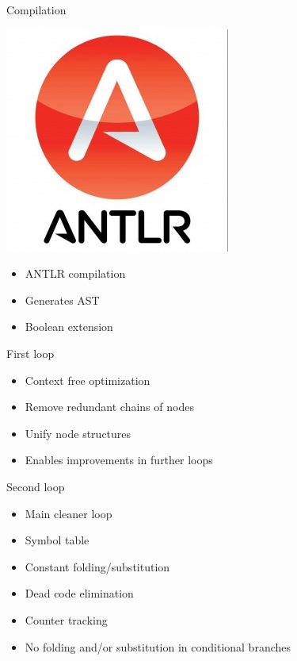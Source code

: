 \documentclass[10pt]{beamer}
\begin{document}
\begin{frame}{Compilation}
	\begin{minipage}[c]{0.3\textwidth}
		\includegraphics[width=\textwidth]{Images/ANTLR.jpeg}
	\end{minipage}
	\hfill
	\begin{minipage}[c]{0.6\textwidth}
		\begin{itemize}
			\item ANTLR compilation
			\item Generates AST
			\item Boolean extension
		\end{itemize}
	\end{minipage}
\end{frame}

\begin{frame}{First loop}
	\begin{itemize}
		\item Context free optimization
		\item Remove redundant chains of nodes
		\item Unify node structures
		\item Enables improvements in further loops
	\end{itemize}
\end{frame}

\begin{frame}{Second loop}
	\begin{itemize}
		\item Main cleaner loop
		\item Symbol table
		\item Constant folding/substitution
		\item Dead code elimination
		\item Counter tracking
		\item No folding and/or substitution in conditional branches
	\end{itemize}
\end{frame}
\end{document}
